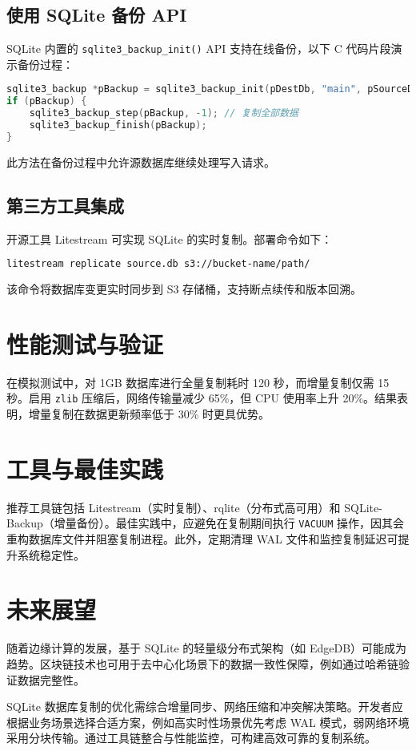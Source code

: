 \section{使用 SQLite 备份 API}
SQLite 内置的 \verb!sqlite3_backup_init()! API 支持在线备份，以下 C 代码片段演示备份过程：\par
\begin{lstlisting}[language=c]
sqlite3_backup *pBackup = sqlite3_backup_init(pDestDb, "main", pSourceDb, "main");
if (pBackup) {
    sqlite3_backup_step(pBackup, -1); // 复制全部数据
    sqlite3_backup_finish(pBackup);
}
\end{lstlisting}
此方法在备份过程中允许源数据库继续处理写入请求。\par
\section{第三方工具集成}
开源工具 Litestream 可实现 SQLite 的实时复制。部署命令如下：\par
\begin{lstlisting}[language=bash]
litestream replicate source.db s3://bucket-name/path/
\end{lstlisting}
该命令将数据库变更实时同步到 S3 存储桶，支持断点续传和版本回溯。\par
\chapter{性能测试与验证}
在模拟测试中，对 1GB 数据库进行全量复制耗时 120 秒，而增量复制仅需 15 秒。启用 \verb!zlib! 压缩后，网络传输量减少 65\%{}，但 CPU 使用率上升 20\%{}。结果表明，增量复制在数据更新频率低于 30\%{} 时更具优势。\par
\chapter{工具与最佳实践}
推荐工具链包括 Litestream（实时复制）、rqlite（分布式高可用）和 SQLite-Backup（增量备份）。最佳实践中，应避免在复制期间执行 \verb!VACUUM! 操作，因其会重构数据库文件并阻塞复制进程。此外，定期清理 WAL 文件和监控复制延迟可提升系统稳定性。\par
\chapter{未来展望}
随着边缘计算的发展，基于 SQLite 的轻量级分布式架构（如 EdgeDB）可能成为趋势。区块链技术也可用于去中心化场景下的数据一致性保障，例如通过哈希链验证数据完整性。\par
SQLite 数据库复制的优化需综合增量同步、网络压缩和冲突解决策略。开发者应根据业务场景选择合适方案，例如高实时性场景优先考虑 WAL 模式，弱网络环境采用分块传输。通过工具链整合与性能监控，可构建高效可靠的复制系统。\par
